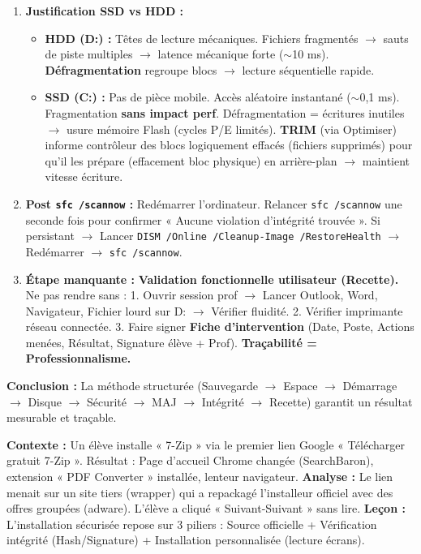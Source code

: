 \documentclass[11pt]{article}
\newcounter{popsec}
\newcounter{popsub}
\newcommand{\courssub}[1]{%
  \stepcounter{popsub}%
  \par\vspace{9pt}\noindent{\popxbold\fontsize{11.5}{13}\selectfont\color{popink}{\color{poporange}\thepopsec.\thepopsub}\hspace{6pt}#1}\par\nopagebreak\vspace{4pt}
}
\begin{document}
\begin{exoresolu}
\begin{enumerate}
\begin{enumerate}
          \end{enumerate}
    \item \textbf{Justification SSD vs HDD :}
          \begin{itemize}
              \item \textbf{HDD (D:) :} Têtes de lecture mécaniques. Fichiers fragmentés $\rightarrow$ sauts de piste multiples $\rightarrow$ latence mécanique forte ($\sim$10 ms). \textbf{Défragmentation} regroupe blocs $\rightarrow$ lecture séquentielle rapide.
              \item \textbf{SSD (C:) :} Pas de pièce mobile. Accès aléatoire instantané ($\sim$0,1 ms). Fragmentation \textbf{sans impact perf}. Défragmentation = écritures inutiles $\rightarrow$ usure mémoire Flash (cycles P/E limités). \textbf{TRIM} (via Optimiser) informe contrôleur des blocs logiquement effacés (fichiers supprimés) pour qu'il les prépare (effacement bloc physique) en arrière-plan $\rightarrow$ maintient vitesse écriture.
          \end{itemize}
    \item \textbf{Post \texttt{sfc /scannow} :} Redémarrer l'ordinateur. Relancer \texttt{sfc /scannow} une seconde fois pour confirmer « Aucune violation d'intégrité trouvée ». Si persistant $\rightarrow$ Lancer \texttt{DISM /Online /Cleanup-Image /RestoreHealth} $\rightarrow$ Redémarrer $\rightarrow$ \texttt{sfc /scannow}.
    \item \textbf{Étape manquante :} \textbf{Validation fonctionnelle utilisateur (Recette).} Ne pas rendre sans : 1. Ouvrir session prof $\rightarrow$ Lancer Outlook, Word, Navigateur, Fichier lourd sur D: $\rightarrow$ Vérifier fluidité. 2. Vérifier imprimante réseau connectée. 3. Faire signer \textbf{Fiche d'intervention} (Date, Poste, Actions menées, Résultat, Signature élève + Prof). \textbf{Traçabilité = Professionnalisme.}
\end{enumerate}
\textbf{Conclusion :} La méthode structurée (Sauvegarde $\rightarrow$ Espace $\rightarrow$ Démarrage $\rightarrow$ Disque $\rightarrow$ Sécurité $\rightarrow$ MAJ $\rightarrow$ Intégrité $\rightarrow$ Recette) garantit un résultat mesurable et traçable.
\end{exoresolu}

\courssub{Installation d'une application simple}

\begin{experience}
    \textbf{Contexte :} Un élève installe « 7-Zip » via le premier lien Google « Télécharger gratuit 7-Zip ». Résultat : Page d'accueil Chrome changée (SearchBaron), extension « PDF Converter » installée, lenteur navigateur.
    \textbf{Analyse :} Le lien menait sur un site tiers (wrapper) qui a repackagé l'installeur officiel avec des offres groupées (adware). L'élève a cliqué « Suivant-Suivant » sans lire.
    \textbf{Leçon :} L'installation sécurisée repose sur 3 piliers : Source officielle + Vérification intégrité (Hash/Signature) + Installation personnalisée (lecture écrans).
\end{experience}
\end{document}

